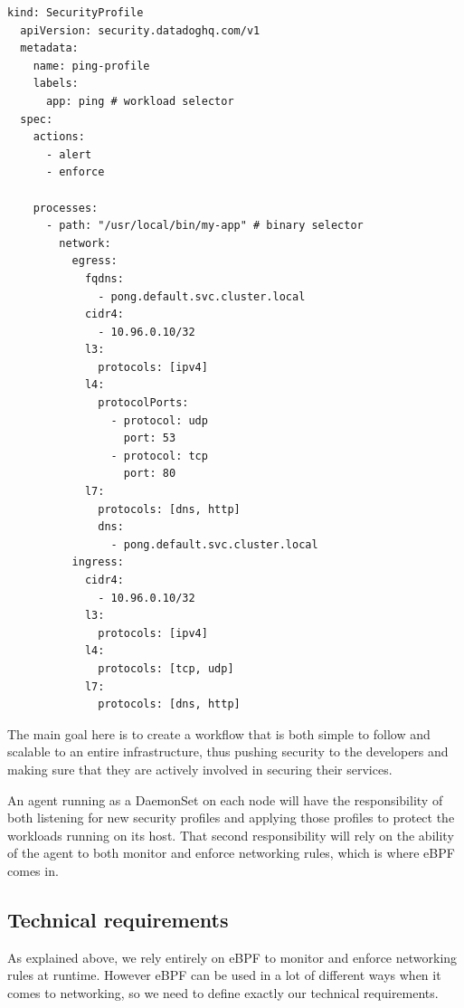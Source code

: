\begin{lstlisting}[language={},basicstyle=\tiny,style=profileStyle,caption={Example of a custom SecurityProfile. This profile applies to all the containers of all the pods with the ping label.},label={lst:ProcessLevelNetworkSecurityMonitoring:securityProfile}]
  kind: SecurityProfile
  apiVersion: security.datadoghq.com/v1
  metadata:
    name: ping-profile
    labels:
      app: ping # workload selector
  spec:
    actions:
      - alert
      - enforce
  
    processes:
      - path: "/usr/local/bin/my-app" # binary selector
        network:
          egress:
            fqdns:
              - pong.default.svc.cluster.local
            cidr4:
              - 10.96.0.10/32
            l3:
              protocols: [ipv4]
            l4:
              protocolPorts:
                - protocol: udp
                  port: 53
                - protocol: tcp
                  port: 80
            l7:
              protocols: [dns, http]
              dns:
                - pong.default.svc.cluster.local
          ingress:
            cidr4:
              - 10.96.0.10/32
            l3:
              protocols: [ipv4]
            l4:
              protocols: [tcp, udp]
            l7:
              protocols: [dns, http]
\end{lstlisting}

The main goal here is to create a workflow that is both simple to follow and scalable to an entire infrastructure, thus pushing security to the developers and making sure that they are actively involved in securing their services.

An agent running as a DaemonSet on each node will have the responsibility of both listening for new security profiles and applying those profiles to protect the workloads running on its host. That second responsibility will rely on the ability of the agent to both monitor and enforce networking rules, which is where eBPF comes in.

\subsection{Technical requirements}

As explained above, we rely entirely on eBPF to monitor and enforce networking rules at runtime. However eBPF can be used in a lot of different ways when it comes to networking, so we need to define exactly our technical requirements.

